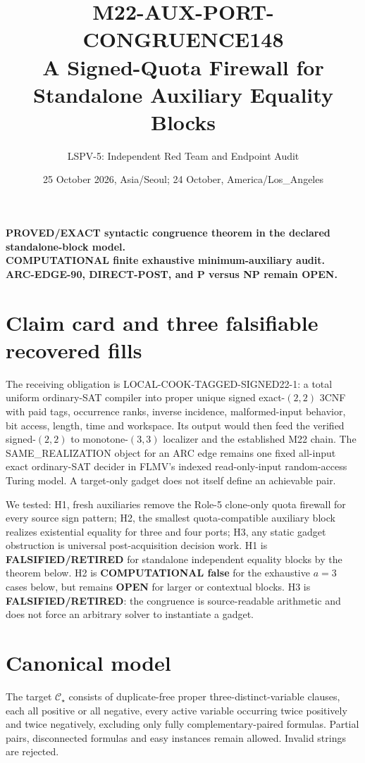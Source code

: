 \documentclass[11pt]{article}
\title{M22-AUX-PORT-CONGRUENCE148\\A Signed-Quota Firewall for Standalone Auxiliary Equality Blocks}
\author{LSPV-5: Independent Red Team and Endpoint Audit}
\date{25 October 2026, Asia/Seoul; 24 October, America/Los\_Angeles}
\newcommand{\CS}{\mathcal C_\star}
\newcommand{\OPEN}{\textbf{OPEN}}
\begin{document}
\maketitle
\begin{center}
\textbf{PROVED/EXACT syntactic congruence theorem in the declared standalone-block model.}\\
\textbf{COMPUTATIONAL finite exhaustive minimum-auxiliary audit.}\\
\textbf{ARC-EDGE-90, DIRECT-POST, and P versus NP remain OPEN.}
\end{center}

\section{Claim card and three falsifiable recovered fills}
The receiving obligation is LOCAL-COOK-TAGGED-SIGNED22-1: a total uniform
ordinary-SAT compiler into proper unique signed exact-$(2,2)$ 3CNF with paid
tags, occurrence ranks, inverse incidence, malformed-input behavior, bit
access, length, time and workspace.  Its output would then feed the verified
signed-$(2,2)$ to monotone-$(3,3)$ localizer and the established M22 chain.
The SAME\_REALIZATION object for an ARC edge remains one fixed all-input exact
ordinary-SAT decider in FLMV's indexed read-only-input random-access Turing
model.  A target-only gadget does not itself define an achievable pair.

We tested: H1, fresh auxiliaries remove the Role-5 clone-only quota firewall
for every source sign pattern; H2, the smallest quota-compatible auxiliary
block realizes existential equality for three and four ports; H3, any static
gadget obstruction is universal post-acquisition decision work.  H1 is
\textbf{FALSIFIED/RETIRED} for standalone independent equality blocks by the
theorem below.  H2 is \textbf{COMPUTATIONAL false} for the exhaustive
$a=3$ cases below, but remains \OPEN{} for larger or contextual blocks.  H3 is
\textbf{FALSIFIED/RETIRED}: the congruence is source-readable arithmetic and
does not force an arbitrary solver to instantiate a gadget.

\section{Canonical model}
The target $\CS$ consists of duplicate-free proper three-distinct-variable
clauses, each all positive or all negative, every active variable occurring
twice positively and twice negatively, excluding only fully
complementary-paired formulas.  Partial pairs, disconnected formulas and easy
instances remain allowed.  Invalid strings are rejected.
\end{document}
